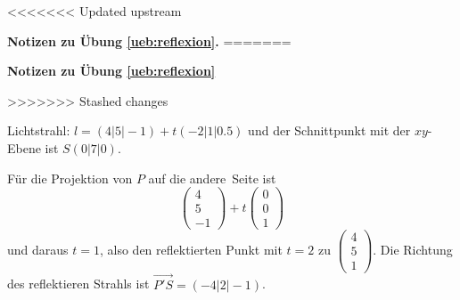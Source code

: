 \documentclass[%
11pt,%
twoside,%
titlepage,%
<<<<<<< Updated upstream
german,%
=======
swissgerman,%
>>>>>>> Stashed changes
headsepline%
]{scrartcl}
\newcommand{\faReturnGray}{\textcolor{gray}{\faMailReply}} %
\theoremstyle{definition}
\theoremstyle{plain}
\newcommand{\concatueb}[1]{ueb:#1}%
\newcommand{\concatlsg}[1]{lsg:#1}%
\newenvironment{lsg}[1]{%
<<<<<<< Updated upstream
    \par\noindent\textbf{Notizen zu Übung \ref{\concatueb{#1}}.}%
    \label{\concatlsg{#1}}
=======
    \par\noindent\textbf{Notizen zu Übung \ref{\concatueb{#1}}}\label{\concatlsg{#1}}
    \hfill\hyperref[\concatueb{#1}]{\faReturnGray}\par %
>>>>>>> Stashed changes
}{%
    \par%
}
\begin{document}
\begin{lsg}{reflexion}
Lichtstrahl: $l=(4|5|-1)+t(-2|1|0.5)$ und der Schnittpunkt mit der $xy$-Ebene ist $S(0|7|0)$.

Für die Projektion von $P$ auf die \glqq andere\grqq\ Seite ist
$$\begin{pmatrix}
    4\\5\\-1
\end{pmatrix}+t\begin{pmatrix}
    0\\0\\1
\end{pmatrix}$$
und daraus $t=1$, also den reflektierten Punkt mit $t=2$ zu $\begin{pmatrix}
    4\\5\\1
\end{pmatrix}$. Die Richtung des reflektieren Strahls ist $\vec{P'S}=(-4|2|-1)$.
\end{lsg}
\end{document}
